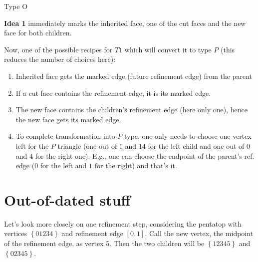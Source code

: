\documentclass[a4paper,12pt]{amsart}
\numberwithin{equation}{section}
\begin{document}
\begin{itemize}
\begin{center}
Type O    
\end{center}
    
    \textbf{Idea 1} immediately marks the inherited face, one of the cut faces and the new face for both children.
    
    Now, one of the possible recipes for $T1$ which will convert it to type $P$ (this reduces the number of choices here):
    	\begin{enumerate}
		\item Inherited face gets the marked edge (future refinement edge) from the parent
		\item If a cut face contains the refinement edge, it is its marked edge.
		\item The new face contains the children's refinement edge (here only one), hence the new face gets its marked edge.
		\item To complete transformation into $P$ type, one only needs to choose one vertex left for the $P$ triangle (one out of $1$ and $14$ for the left child and one out of $0$ and $4$ for the right one). E.g., one can choose the endpoint of the parent's ref. edge ($0$ for the left and $1$ for the right) and that's it.
	\end{enumerate}	
	
\end{itemize}

\section{Out-of-dated stuff}

Let's look more closely on one refinement step, considering the pentatop with vertices $\left\{01234\right\}$ and refinement edge $[0,1]$. Call the new vertex, the midpoint of the refinement edge, as vertex $5$. Then the two children will be $\left\{12345\right\}$ and $\left\{02345\right\}$.
\end{document}
